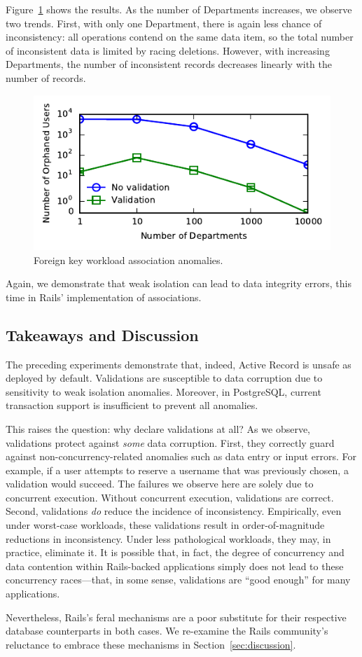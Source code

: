 Figure~\ref{fig:fk-workload} shows the results. As the number of
Departments increases, we observe two trends. First, with only one
Department, there is again less chance of inconsistency: all
operations contend on the same data item, so the total number of
inconsistent data is limited by racing deletions. However, with
increasing Departments, the number of inconsistent records decreases
linearly with the number of records.

\begin{figure}
\includegraphics[width=\columnwidth]{figs/fk-workload-violations.pdf}\vspace{-1em}
\caption{Foreign key workload association anomalies.}
\label{fig:fk-workload}
\end{figure}

 Again, we demonstrate that weak isolation can lead
to data integrity errors, this time in Rails' implementation of
associations.

\subsection{Takeaways and Discussion}

The preceding experiments demonstrate that, indeed, Active Record is
unsafe as deployed by default. Validations are susceptible to data
corruption due to sensitivity to weak isolation anomalies. Moreover,
in PostgreSQL, current transaction support is insufficient to prevent
all anomalies.

This raises the question: why declare validations at all? As we
observe, validations protect against \textit{some} data
corruption. First, they correctly guard against
non-concurrency-related anomalies such as data entry or input
errors. For example, if a user attempts to reserve a username that was
previously chosen, a validation would succeed. The failures we observe
here are solely due to concurrent execution. Without concurrent
execution, validations are correct. Second, validations \textit{do}
reduce the incidence of inconsistency. Empirically, even under
worst-case workloads, these validations result in order-of-magnitude
reductions in inconsistency. Under less pathological workloads, they
may, in practice, eliminate it. It is possible that, in fact, the
degree of concurrency and data contention within Rails-backed
applications simply does not lead to these concurrency races---that,
in some sense, validations are ``good enough'' for many applications.

Nevertheless, Rails's feral mechanisms are a poor substitute for their
respective database counterparts in both cases. We re-examine the Rails community's
reluctance to embrace these mechanisms in Section~\ref{sec:discussion}.

